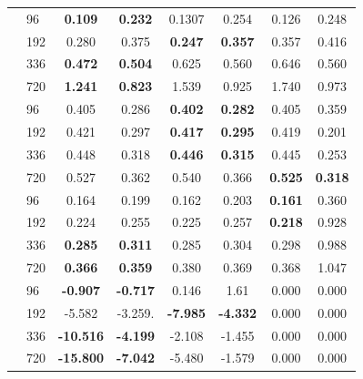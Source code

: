 \begin{table}[ht!]
\begin{center}
\begin{tabular}{ll | cccccc}
									& 96  & \textbf{0.109}   & \textbf{0.232}   & 0.1307          &  0.254          & 0.126          & 0.248          \\
									& 192 & 0.280            & 0.375            & \textbf{0.247}  &  \textbf{0.357} & 0.357          & 0.416          \\
									& 336 & \textbf{0.472}   & \textbf{0.504}   & 0.625           &  0.560          & 0.646          & 0.560          \\
									& 720 & \textbf{1.241}   & \textbf{0.823}   & 1.539           &  0.925          & 1.740          & 0.973          \\ \midrule
\parbox[t]{1mm}{}
									& 96  & 0.405            & 0.286            & \textbf{0.402}  & \textbf{0.282}  & 0.405          & 0.359          \\
									& 192 & 0.421            & 0.297            & \textbf{0.417}  & \textbf{0.295}  & 0.419          & 0.201          \\
									& 336 & 0.448            & 0.318            & \textbf{0.446}  & \textbf{0.315}  & 0.445          & 0.253          \\
									& 720 & 0.527            & 0.362            & 0.540           &  0.366          & \textbf{0.525} & \textbf{0.318} \\ \midrule
\parbox[t]{1mm}{}									
									& 96  & 0.164            & 0.199            & 0.162           &  0.203          & \textbf{0.161} & 0.360          \\
									& 192 & 0.224            & 0.255            & 0.225           &  0.257          & \textbf{0.218} & 0.928          \\
									& 336 & \textbf{0.285}   & \textbf{0.311}   & 0.285           &  0.304          & 0.298          & 0.988          \\
									& 720 & \textbf{0.366}   & \textbf{0.359}   & 0.380           &  0.369          & 0.368          & 1.047          \\ \midrule \midrule
\parbox[t]{1mm}{}
									& 96  & \textbf{-0.907}  & \textbf{-0.717}  & 0.146           & 1.61            & 0.000          & 0.000          \\
									& 192 & -5.582           & -3.259.          & \textbf{-7.985} & \textbf{-4.332} & 0.000          & 0.000          \\
									& 336 & \textbf{-10.516} & \textbf{-4.199}  & -2.108          & -1.455          & 0.000          & 0.000          \\
									& 720 & \textbf{-15.800} & \textbf{-7.042}  & -5.480          & -1.579          & 0.000          & 0.000          \\ \bottomrule
	\end{tabular}
	\end{center}
\end{table}